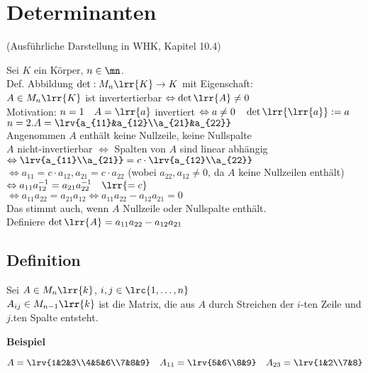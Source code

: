 \chapter{Determinanten}

	(Ausführliche Darstellung in WHK, Kapitel 10.4)

	Sei $K$ ein Körper, $n\in\mn$.\\
	Def. Abbildung $\det:M_n\lrr{K}\rightarrow K$ mit Eigenschaft:\\
	$A\in M_n\lrr{K}$ ist invertertierbar $\Leftrightarrow\det\lrr{A}\neq 0$\\
	Motivation: $n=1\quad A=\lrr{a}$ invertiert $\Leftrightarrow a\neq 0\quad\det\lrr{\lrr{a}}:=a$\\
	$n=2. A=\lrv{a_{11}&a_{12}\\a_{21}&a_{22}}$\\
	Angenommen $A$ enthält keine Nullzeile, keine Nullspalte\\
	$A$ nicht-invertierbar $\Leftrightarrow$ Spalten von $A$ sind linear abhängig $\Leftrightarrow\lrv{a_{11}\\a_{21}}=c\cdot\lrv{a_{12}\\a_{22}}$\\
	$\Leftrightarrow a_{11}=c\cdot a_{12}, a_{21}=c\cdot a_{22}$ (wobei $a_{22},a_{12}\neq 0$, da $A$ keine Nullzeilen enthält)\\
	$\Leftrightarrow a_{11}a_{12}^{-1}=a_{21}a_{22}^{-1}\quad \lrr{=c}$\\
	$\Leftrightarrow a_{11}a_{22}=a_{21}a_{12}\Leftrightarrow a_{11}a_{22}-a_{12}a_{21}=0$\\
	Das stimmt auch, wenn $A$ Nullzeile oder Nullspalte enthält.\\
	Definiere $\det\lrr{A}=a_{11}a_{22}-a_{12}a_{21}$

\section{Definition}
	Sei $A\in M_n\lrr{k}$, $i,j\in\lrc{1,\dots,n}$\\
	$A_{ij}\in M_{n-1}\lrr{k}$ ist die Matrix, die aus $A$ durch Streichen der $i$-ten Zeile und $j$.ten Spalte entsteht.

	\textbf{Beispiel}

	$A=\lrv{1&2&3\\4&5&6\\7&8&9}\quad A_{11}=\lrv{5&6\\8&9}\quad A_{23}=\lrv{1&2\\7&8}$

